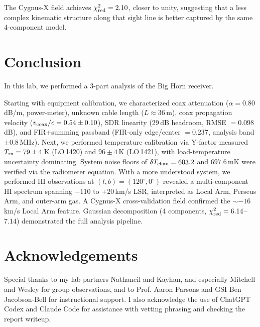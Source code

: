 \documentclass[10pt,preprint2]{aastex}
\begin{document}
The Cygnus-X field achieves $\chi^2_{\rm red} = 2.10$,
closer to unity, suggesting that a less complex kinematic structure along
that sight line is better captured by the same 4-component model.

\section{Conclusion}
\label{sec:conclusion}

In this lab, we performed a 3-part analysis of the Big Horn receiver.

Starting with equipment calibration, we characterized coax attenuation
($\alpha = 0.80$\,dB/m, power-meter), unknown cable length
($L \approx 36$\,m), coax propagation velocity
($v_{\rm coax}/c = 0.54 \pm 0.10$), SDR linearity (29\,dB headroom,
RMSE $= 0.098$\,dB), and FIR+summing passband
(FIR-only edge/center $= 0.237$, analysis band $\pm 0.8$\,MHz). Next, we performed temperature calibration via Y-factor measured
$T_{\rm rx} = 79 \pm 4$\,K (LO\,1420) and
$96 \pm 4$\,K (LO\,1421),
with load-temperature uncertainty dominating.
System noise floors of $\delta T_{\rm chan} = 603.2$ and $697.6$\,mK
were verified via the radiometer equation. With a more understood system, we performed
HI observations at $(l,b) = (120^\circ, 0^\circ)$ revealed
a multi-component HI spectrum spanning $-110$ to $+20$\,km/s LSR,
interpreted as Local Arm, Perseus Arm, and outer-arm gas.
A Cygnus-X cross-validation field confirmed the
$\sim -16$\,km/s Local Arm feature.
Gaussian decomposition (4 components, $\chi^2_{\rm red} = 6.14$--$7.14$)
demonstrated the full analysis pipeline.

\section*{Acknowledgements}
Special thanks to my lab partners Nathaneil and Kayhan, and especially Mitchell and Wesley for group observations,
and to Prof. Aaron Parsons and GSI Ben Jacobson-Bell for instructional support.
I also acknowledge the use of ChatGPT Codex and Claude Code for assistance
with vetting phrasing and checking the report writeup.




\appendix

\end{document}
